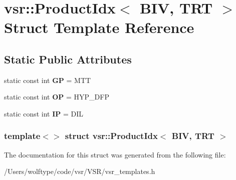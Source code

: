 \hypertarget{structvsr_1_1_product_idx_3_01_b_i_v_00_01_t_r_t_01_4}{\section{vsr\-:\-:Product\-Idx$<$ B\-I\-V, T\-R\-T $>$ Struct Template Reference}
\label{structvsr_1_1_product_idx_3_01_b_i_v_00_01_t_r_t_01_4}
}
\subsection*{Static Public Attributes}
\begin{DoxyCompactItemize}
\item 
\hypertarget{structvsr_1_1_product_idx_3_01_b_i_v_00_01_t_r_t_01_4_ab77fac9faaddfd1afc49d310ad208807}{static const int {\bfseries G\-P} = M\-T\-T}\label{structvsr_1_1_product_idx_3_01_b_i_v_00_01_t_r_t_01_4_ab77fac9faaddfd1afc49d310ad208807}

\item 
\hypertarget{structvsr_1_1_product_idx_3_01_b_i_v_00_01_t_r_t_01_4_afbe81dedf15ed99ca5935c44512f9677}{static const int {\bfseries O\-P} = H\-Y\-P\-\_\-\-D\-F\-P}\label{structvsr_1_1_product_idx_3_01_b_i_v_00_01_t_r_t_01_4_afbe81dedf15ed99ca5935c44512f9677}

\item 
\hypertarget{structvsr_1_1_product_idx_3_01_b_i_v_00_01_t_r_t_01_4_a109ed2bbb9adf47d06263811df70f353}{static const int {\bfseries I\-P} = D\-I\-L}\label{structvsr_1_1_product_idx_3_01_b_i_v_00_01_t_r_t_01_4_a109ed2bbb9adf47d06263811df70f353}

\end{DoxyCompactItemize}
\subsubsection*{template$<$$>$ struct vsr\-::\-Product\-Idx$<$ B\-I\-V, T\-R\-T $>$}



The documentation for this struct was generated from the following file\-:\begin{DoxyCompactItemize}
\item 
/\-Users/wolftype/code/vsr/\-V\-S\-R/vsr\-\_\-templates.\-h\end{DoxyCompactItemize}

